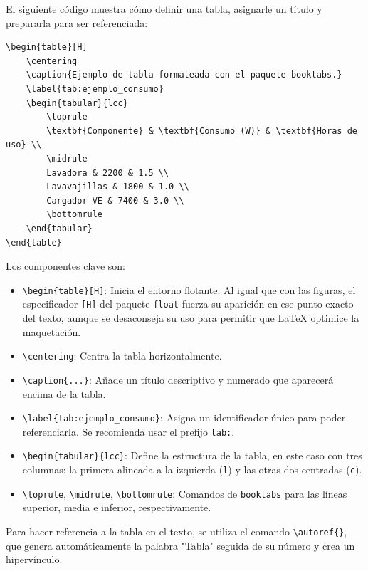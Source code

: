 \documentclass[11pt,a4paper]{book}
\begin{document}
El siguiente código muestra cómo definir una tabla, asignarle un título y prepararla para ser referenciada:

\begin{verbatim}
\begin{table}[H]
    \centering
    \caption{Ejemplo de tabla formateada con el paquete booktabs.}
    \label{tab:ejemplo_consumo}
    \begin{tabular}{lcc}
        \toprule
        \textbf{Componente} & \textbf{Consumo (W)} & \textbf{Horas de uso} \\
        \midrule
        Lavadora & 2200 & 1.5 \\
        Lavavajillas & 1800 & 1.0 \\
        Cargador VE & 7400 & 3.0 \\
        \bottomrule
    \end{tabular}
\end{table}
\end{verbatim}

Los componentes clave son:
\begin{itemize}
    \item \verb|\begin{table}[H]|: Inicia el entorno flotante. Al igual que con las figuras, el especificador \texttt{[H]} del paquete \texttt{float} fuerza su aparición en ese punto exacto del texto, aunque se desaconseja su uso para permitir que \LaTeX{} optimice la maquetación.
    \item \verb|\centering|: Centra la tabla horizontalmente.
    \item \verb|\caption{...}|: Añade un título descriptivo y numerado que aparecerá encima de la tabla.
    \item \verb|\label{tab:ejemplo_consumo}|: Asigna un identificador único para poder referenciarla. Se recomienda usar el prefijo \texttt{tab:}.
    \item \verb|\begin{tabular}{lcc}|: Define la estructura de la tabla, en este caso con tres columnas: la primera alineada a la izquierda (\texttt{l}) y las otras dos centradas (\texttt{c}).
    \item \verb|\toprule|, \verb|\midrule|, \verb|\bottomrule|: Comandos de \texttt{booktabs} para las líneas superior, media e inferior, respectivamente.
\end{itemize}

Para hacer referencia a la tabla en el texto, se utiliza el comando \verb|\autoref{}|, que genera automáticamente la palabra "Tabla" seguida de su número y crea un hipervínculo.
\end{document}
